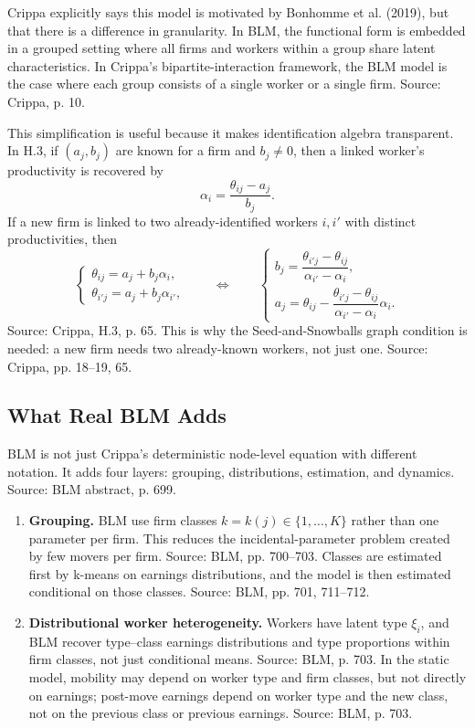 \documentclass[11pt]{article}
\begin{document}
Crippa explicitly says this model is motivated by Bonhomme et al. (2019), but that
there is a difference in granularity. In BLM, the functional form is embedded in a
grouped setting where all firms and workers within a group share latent
characteristics. In Crippa's bipartite-interaction framework, the BLM model is the
case where each group consists of a single worker or a single firm. Source: Crippa,
p. 10.

This simplification is useful because it makes identification algebra transparent. In
H.3, if $(a_j,b_j)$ are known for a firm and $b_j\neq0$, then a linked worker's
productivity is recovered by
\[
\alpha_i=\frac{\theta_{ij}-a_j}{b_j}.
\]
If a new firm is linked to two already-identified workers $i,i'$ with distinct
productivities, then
\[
\begin{cases}
\theta_{ij}=a_j+b_j\alpha_i,\\
\theta_{i'j}=a_j+b_j\alpha_{i'},
\end{cases}
\qquad\Longleftrightarrow\qquad
\begin{cases}
b_j=\dfrac{\theta_{i'j}-\theta_{ij}}{\alpha_{i'}-\alpha_i},\\[1.0em]
a_j=\theta_{ij}-\dfrac{\theta_{i'j}-\theta_{ij}}{\alpha_{i'}-\alpha_i}\alpha_i.
\end{cases}
\]
Source: Crippa, H.3, p. 65. This is why the Seed-and-Snowballs graph condition is
needed: a new firm needs two already-known workers, not just one. Source: Crippa,
pp. 18--19, 65.

\subsection{What Real BLM Adds}

BLM is not just Crippa's deterministic node-level equation with different notation.
It adds four layers: grouping, distributions, estimation, and dynamics. Source: BLM
abstract, p. 699.

\begin{enumerate}
\item \textbf{Grouping.} BLM use firm classes $k=k(j)\in\{1,\ldots,K\}$ rather than
one parameter per firm. This reduces the incidental-parameter problem created by
few movers per firm. Source: BLM, pp. 700--703. Classes are estimated first by
k-means on earnings distributions, and the model is then estimated conditional on
those classes. Source: BLM, pp. 701, 711--712.

\item \textbf{Distributional worker heterogeneity.} Workers have latent type $\xi_i$,
and BLM recover type--class earnings distributions and type proportions within firm
classes, not just conditional means. Source: BLM, p. 703. In the static model,
mobility may depend on worker type and firm classes, but not directly on earnings;
post-move earnings depend on worker type and the new class, not on the previous
class or previous earnings. Source: BLM, p. 703.
\end{enumerate}
\end{document}
